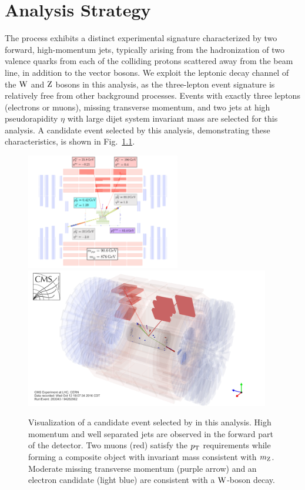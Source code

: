 \chapter{Analysis Strategy}
\label{sec:analysis}

The \EWWZ process exhibits a distinct experimental signature characterized by two forward, 
high-momentum jets, typically arising from the hadronization of 
two valence quarks from each of the colliding
protons scattered away from the beam line, in addition 
to the vector bosons. We exploit the leptonic decay channel of the $\mathrm{W}$ and $\mathrm{Z}$
bosons in this analysis, as the three-lepton event signature is relatively free
from other background processes. 
Events with exactly three leptons (electrons or muons), 
missing transverse momentum, 
and two jets at high pseudorapidity $\eta$ with large dijet system invariant mass {\mjj}
are selected for this analysis.
A candidate \EWWZ event selected by this analysis,
demonstrating these characteristics, is shown in Fig.~\ref{fig:eventView}.

\begin{figure}[htbp]
  \centering
   \includegraphics[width=0.6\textwidth]{figures/AnalysisProcedure/AnnotatedEventViewWZjjZProj.pdf}
   \includegraphics[width=0.95\textwidth]{figures/AnalysisProcedure/WZjjFullEventView.png}
  \caption{
    Visualization of a candidate \EWWZ event selected by in this analysis. High momentum
    and well separated jets are observed in the forward part of the detector. Two muons
    (red) satisfy the $p_{\mathrm{T}}$ requirements while forming a composite object with invariant
    mass consistent with $m_{\mathrm{Z}}$. Moderate missing transverse momentum (purple arrow)
    and an electron candidate (light blue) are consistent with a $\mathrm{W}$-boson decay.
        }
 \label{fig:eventView}
\end{figure}

